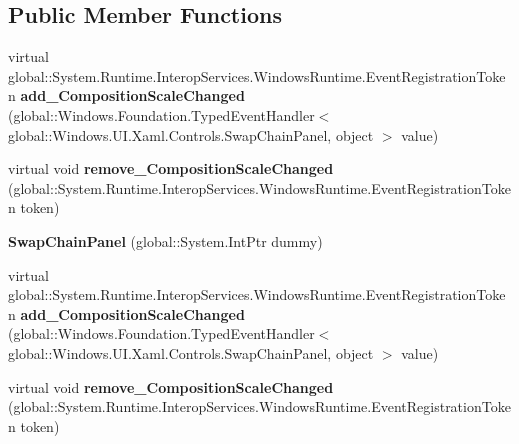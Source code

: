 \subsection*{Public Member Functions}
\begin{DoxyCompactItemize}
\item 
\mbox{\label{class_windows_1_1_u_i_1_1_xaml_1_1_controls_1_1_swap_chain_panel_a1e9bf0904d5c5eb2ae257878d54180b3}} 
virtual global\+::\+System.\+Runtime.\+Interop\+Services.\+Windows\+Runtime.\+Event\+Registration\+Token {\bfseries add\+\_\+\+Composition\+Scale\+Changed} (global\+::\+Windows.\+Foundation.\+Typed\+Event\+Handler$<$ global\+::\+Windows.\+U\+I.\+Xaml.\+Controls.\+Swap\+Chain\+Panel, object $>$ value)
\item 
\mbox{\label{class_windows_1_1_u_i_1_1_xaml_1_1_controls_1_1_swap_chain_panel_a50e6f6e6ea2dc3470be06877f3ac04b8}} 
virtual void {\bfseries remove\+\_\+\+Composition\+Scale\+Changed} (global\+::\+System.\+Runtime.\+Interop\+Services.\+Windows\+Runtime.\+Event\+Registration\+Token token)
\item 
\mbox{\label{class_windows_1_1_u_i_1_1_xaml_1_1_controls_1_1_swap_chain_panel_a6de3689912620c444d7d52113f389d56}} 
{\bfseries Swap\+Chain\+Panel} (global\+::\+System.\+Int\+Ptr dummy)
\item 
\mbox{\label{class_windows_1_1_u_i_1_1_xaml_1_1_controls_1_1_swap_chain_panel_a1e9bf0904d5c5eb2ae257878d54180b3}} 
virtual global\+::\+System.\+Runtime.\+Interop\+Services.\+Windows\+Runtime.\+Event\+Registration\+Token {\bfseries add\+\_\+\+Composition\+Scale\+Changed} (global\+::\+Windows.\+Foundation.\+Typed\+Event\+Handler$<$ global\+::\+Windows.\+U\+I.\+Xaml.\+Controls.\+Swap\+Chain\+Panel, object $>$ value)
\item 
\mbox{\label{class_windows_1_1_u_i_1_1_xaml_1_1_controls_1_1_swap_chain_panel_a50e6f6e6ea2dc3470be06877f3ac04b8}} 
virtual void {\bfseries remove\+\_\+\+Composition\+Scale\+Changed} (global\+::\+System.\+Runtime.\+Interop\+Services.\+Windows\+Runtime.\+Event\+Registration\+Token token)

\end{DoxyCompactItemize}
